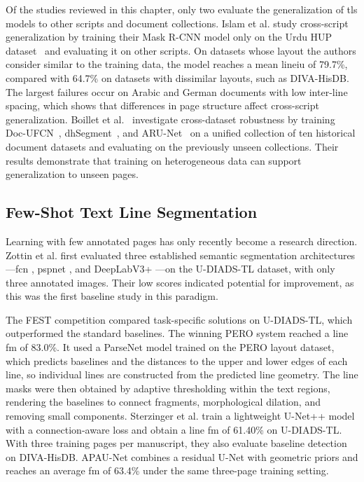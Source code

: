 Of the studies reviewed in this chapter, only two evaluate the generalization of \gls{tls} models to other scripts and document collections. Islam et al. \cite{Textline_maskrcnn} study cross-script generalization by training their Mask R-CNN model only on the Urdu HUP dataset~\cite{Textline_maskrcnn} and evaluating it on other scripts. On datasets whose layout the authors consider similar to the training data, the model reaches a mean \gls{lineiu} of 79.7\%, compared with 64.7\% on datasets with dissimilar layouts, such as DIVA-HisDB. The largest failures occur on Arabic and German documents with low inter-line spacing, which shows that differences in page structure affect cross-script generalization. Boillet et al.~\cite{Boillet2022} investigate cross-dataset robustness by
training Doc-UFCN~\cite{boillet2021docufcn},
dhSegment~\cite{oliveira2018dhsegment}, and
ARU-Net~\cite{gruning2019arunet} on a unified collection of ten
historical document datasets and evaluating on the previously unseen collections. Their results
demonstrate that training on heterogeneous data can support
generalization to unseen pages. 

\subsection{Few-Shot Text Line Segmentation}
\label{sec:related-fewshot}

Learning with few annotated pages has only recently become a research direction. Zottin et al. \cite{zottin2025exploring} first evaluated three established semantic segmentation architectures---\gls{fcn} \cite{long2015fully}, \gls{pspnet} \cite{zhao2017pyramid}, and DeepLabV3+ \cite{chen2018encoder}---on the U-DIADS-TL dataset, with only three annotated images. Their low scores indicated potential for improvement, as this was the first baseline study in this paradigm.

The FEST competition \cite{Zottin_2025_FEST} compared task-specific solutions on U-DIADS-TL, which outperformed the standard baselines. The winning PERO system reached a line \gls{fm} of 83.0\%. It used a ParseNet model \cite{kodym2021page} trained on the PERO layout dataset, which predicts baselines and the distances to the upper and lower edges of each line, so individual lines are constructed from the predicted line geometry. The line masks were then obtained by adaptive thresholding within the text regions, rendering the baselines to connect fragments, morphological dilation, and removing small components. Sterzinger et al. \cite{sterzinger2025fewshot} train a lightweight U-Net++ model with a connection-aware loss and obtain a line \gls{fm} of 61.40\% on U-DIADS-TL. With three training pages per manuscript, they also evaluate baseline detection on DIVA-HisDB. APAU-Net \cite{Beghoura2026-dp} combines a residual U-Net with geometric priors and reaches an average \gls{fm} of 63.4\% under the same three-page training setting.

